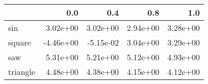 \begin{tabular}{lrrrr}
\toprule
{} &       0.0 &       0.4 &      0.8 &      1.0 \\
\midrule
sin      &  3.02e+00 &  3.02e+00 & 2.94e+00 & 3.28e+00 \\
square   & -4.46e+00 & -5.15e-02 & 3.04e+00 & 3.29e+00 \\
saw      &  5.31e+00 &  5.21e+00 & 5.12e+00 & 4.93e+00 \\
triangle &  4.48e+00 &  4.38e+00 & 4.15e+00 & 4.12e+00 \\
\bottomrule
\end{tabular}
